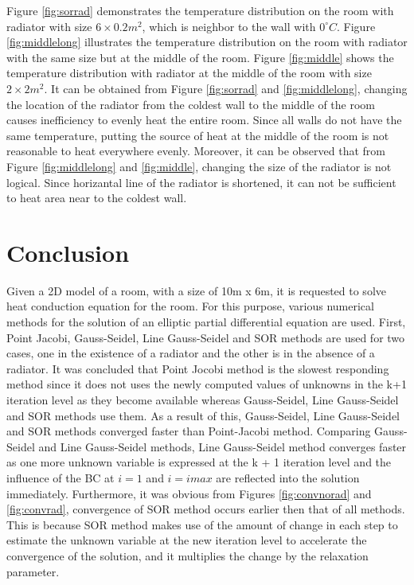 \documentclass[letterpaper,12pt]{article}
\begin{document}
Figure \ref{fig:sorrad} demonstrates the temperature distribution
on the room with radiator with size $6\times0.2 m^2$, which is
neighbor to the wall with $0^\circ C$. Figure \ref{fig:middlelong} illustrates the
temperature distribution on the room with radiator with the same size but at
the middle of the room. Figure \ref{fig:middle} shows the temperature
distribution with radiator at the middle of the room with size $2\times2 m^2$.
It can be obtained from Figure \ref{fig:sorrad} and \ref{fig:middlelong},
changing the location of the radiator from the coldest wall to the middle
of the room causes inefficiency to evenly heat the entire room. Since all walls do not have
the same temperature, putting the source of heat at the middle of the room
is not reasonable to heat everywhere evenly. Moreover, it can be observed that from Figure
\ref{fig:middlelong} and \ref{fig:middle}, changing the size of the radiator is not logical.
Since horizantal line of the radiator is shortened, it can not be sufficient to heat area near to
the coldest wall. 



\section{Conclusion}
Given a 2D model of a room, with a size of 10m x 6m, it is requested to solve heat conduction equation for
the room. For this purpose, various numerical methods for the solution of an elliptic partial differential
equation are used. First, Point Jacobi, Gauss-Seidel, Line Gauss-Seidel and SOR methods are used for two cases,
one in the existence of a radiator and the other is in the absence of a radiator. It was concluded that Point
Jocobi method is the slowest responding method since it does not uses the newly computed values of unknowns in the k+1 iteration
level as they become available whereas Gauss-Seidel, Line Gauss-Seidel and SOR methods use them. As a result of this, Gauss-Seidel,
Line Gauss-Seidel and SOR methods converged faster than Point-Jacobi method. Comparing Gauss-Seidel and Line Gauss-Seidel methods,
Line Gauss-Seidel method converges faster as one more unknown variable is expressed at the k + 1 iteration level and the influence
of the BC at $i = 1$ and $i = imax$ are reflected into the solution immediately. Furthermore, it was obvious
from Figures \ref{fig:convnorad} and \ref{fig:convrad}, convergence of SOR method occurs earlier then
that of all methods. This is because SOR method makes use of the amount of change in each step to 
estimate the unknown variable at the new iteration level to accelerate the convergence of the solution, and
it multiplies the change by the relaxation parameter.
\end{document}
